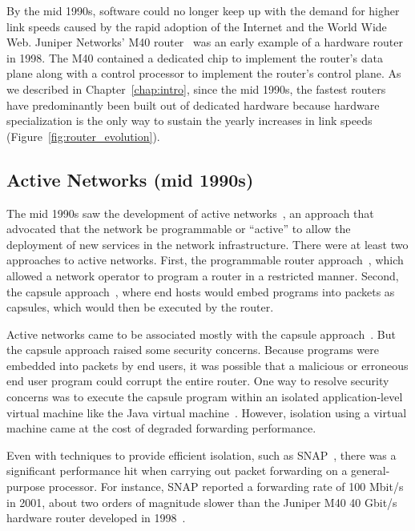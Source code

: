 By the mid 1990s, software could no longer keep up with the demand for higher
link speeds caused by the rapid adoption of the Internet and the World Wide
Web. Juniper Networks' M40 router~\cite{m40} was an early example of a hardware
router in 1998.  The M40 contained a dedicated chip to implement the router's
data plane along with a control processor to implement the router's control
plane. As we described in Chapter~\ref{chap:intro}, since the mid 1990s, the
fastest routers have predominantly been built out of dedicated hardware because
hardware specialization is the only way to sustain the yearly increases in link
speeds (Figure~\ref{fig:router_evolution}).

\subsection{Active Networks (mid 1990s)}
The mid 1990s saw the development of active networks~\cite{ants, switchware}, an
approach that advocated that the network be programmable or ``active'' to allow
the deployment of new services in the network infrastructure. There were at
least two approaches to active networks. First, the programmable router
approach~\cite{switchware}, which allowed a network operator to program a
router in a restricted manner. Second, the capsule approach~\cite{ants,
wetherall_thesis, anet_retrospective}, where end hosts would embed programs
into packets as capsules, which would then be executed by the router.

Active networks came to be associated mostly with the capsule
approach~\cite{sdn_history}. But the capsule approach raised some security
concerns. Because programs were embedded into packets by end users, it was
possible that a malicious or erroneous end user program could corrupt the
entire router.  One way to resolve security concerns was to execute the capsule
program within an isolated application-level virtual machine like the Java
virtual machine~\cite{ants, wetherall_thesis, anet_retrospective}. However,
isolation using a virtual machine came at the cost of degraded forwarding performance.

Even with techniques to provide efficient isolation, such as
SNAP~\cite{snap_active_packets}, there was a significant performance hit when
carrying out packet forwarding on a general-purpose processor.  For instance,
SNAP reported a forwarding rate of 100 Mbit/s in
2001, about two orders of magnitude slower than the Juniper M40 40 Gbit/s
hardware router developed in 1998~\cite{m40}.

